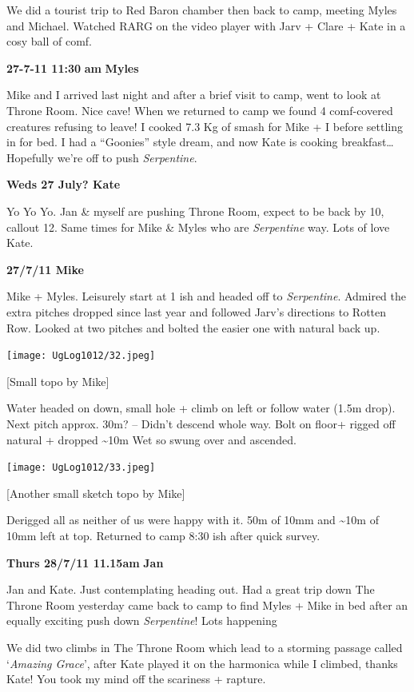 We did a tourist trip to Red Baron chamber then back to camp, meeting
Myles and Michael. Watched RARG on the video player with Jarv + Clare +
Kate in a cosy ball of comf.

\textbf{27-7-11 11:30} \textbf{am} \textbf{Myles}

Mike and I arrived last night and after a brief visit to camp, went to
look at Throne Room. Nice cave! When we returned to camp we found 4
comf-covered creatures refusing to leave! I cooked 7.3 Kg of smash for
Mike + I before settling in for bed. I had a ``Goonies'' style dream,
and now Kate is cooking breakfast\ldots{} Hopefully we're off to push
\emph{Serpentine}.

\textbf{Weds 27 July? Kate}

Yo Yo Yo. Jan \& myself are pushing Throne Room, expect to be back by
10, callout 12. Same times for Mike \& Myles who are \emph{Serpentine}
way. Lots of love Kate.

\textbf{27/7/11 Mike}

Mike + Myles. Leisurely start at 1 ish and headed off to
\emph{Serpentine}. Admired the extra pitches dropped since last year and
followed Jarv's directions to Rotten Row. Looked at two pitches and
bolted the easier one with natural back up.

\texttt{[image: UgLog1012/32.jpeg]}

{[}Small topo by Mike{]}

Water headed on down, small hole + climb on left or follow water (1.5m
drop). Next pitch approx. 30m? -- Didn't descend whole way. Bolt on
floor+ rigged off natural + dropped \textasciitilde{}10m Wet so swung
over and ascended.

\texttt{[image: UgLog1012/33.jpeg]}

{[}Another small sketch topo by Mike{]}

Derigged all as neither of us were happy with it. 50m of 10mm and
\textasciitilde{}10m of 10mm left at top. Returned to camp 8:30 ish
after quick survey.

\textbf{Thurs 28/7/11 11.15am} \textbf{Jan}

Jan and Kate. Just contemplating heading out. Had a great trip down The
Throne Room yesterday came back to camp to find Myles + Mike in bed
after an equally exciting push down \emph{Serpentine}! Lots happening

We did two climbs in The Throne Room which lead to a storming passage
called `\emph{Amazing Grace}', after Kate played it on the harmonica
while I climbed, thanks Kate! You took my mind off the scariness +
rapture.

